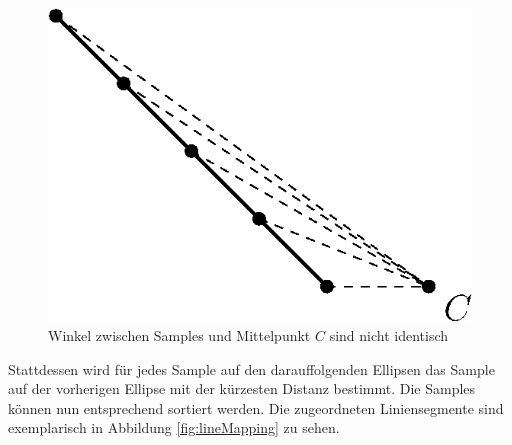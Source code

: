 \begin{figure}[!htb]
	\centering
	\includegraphics[scale=.9]{images/sampleMappingProblem.eps}
	\caption{Winkel zwischen Samples und Mittelpunkt $C$ sind nicht identisch}
	\label{fig:sampleMappingProblem}
\end{figure}

Stattdessen wird für jedes Sample auf den darauffolgenden Ellipsen das Sample auf der vorherigen Ellipse mit der kürzesten Distanz bestimmt. 
Die Samples können nun entsprechend sortiert werden. Die zugeordneten Liniensegmente sind exemplarisch in Abbildung \ref{fig:lineMapping} zu sehen. 


